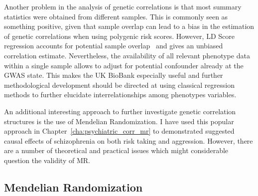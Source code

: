 Another problem in the analysis of genetic correlations is that most summary statistics were obtained from different samples.
This is commonly seen as something positive, given that sample overlap can lead to a bias in the estimation of genetic correlations when using polygenic risk scores. 
However, LD Score regression accounts for potential sample overlap~\cite{Bulik-Sullivan2015a} and gives an unbiased correlation estimate.  
Nevertheless, the availability of all relevant phenotype data within a single sample allows to adjust for potential confounder already at the GWAS state.
This makes the UK BioBank especially useful and further methodological development should be directed at using classical regression methods to further elucidate interrelationships among phenotypes variables.

An additional interesting approach to further investigate genetic correlation structures is the use of Mendelian Randomization.
I have used this popular approach in Chapter~\ref{cha:psychiatric_corr_mr} to demonstrated suggested causal effects of schizophrenia on both risk taking and aggression.
However, there are a number of theoretical and practical issues which might considerable question the validity of MR\@.

\subsection{Mendelian Randomization}
\label{sub:mendelian_randomization_discussion}

